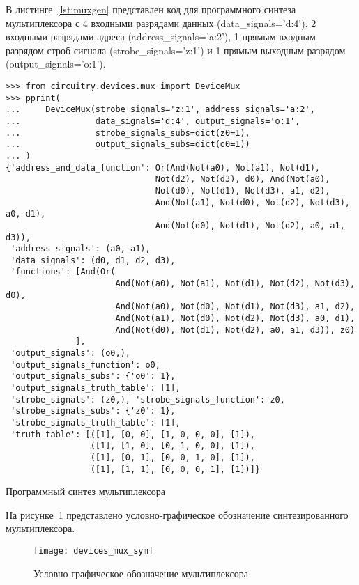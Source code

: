 \documentclass[document.tex]{subfiles}
\begin{document}
\clearpage
В листинге~\ref{lst:muxgen} представлен код для программного синтеза
мультиплексора с 4 входными разрядами данных (data\_signals='d:4'), 2 входными
разрядами адреса (address\_signals='a:2'), 1 прямым входным разрядом
строб-сигнала (strobe\_signals='z:1') и 1 прямым выходным разрядом
(output\_signals='o:1').

\begin{listing}[ht]
\begin{verbatim}
>>> from circuitry.devices.mux import DeviceMux        
>>> pprint(                                               
...     DeviceMux(strobe_signals='z:1', address_signals='a:2',
...               data_signals='d:4', output_signals='o:1',
...               strobe_signals_subs=dict(z0=1),
...               output_signals_subs=dict(o0=1))
... )
{'address_and_data_function': Or(And(Not(a0), Not(a1), Not(d1), 
                              Not(d2), Not(d3), d0), And(Not(a0), 
                              Not(d0), Not(d1), Not(d3), a1, d2), 
                              And(Not(a1), Not(d0), Not(d2), Not(d3), a0, d1), 
                              And(Not(d0), Not(d1), Not(d2), a0, a1, d3)),
 'address_signals': (a0, a1),
 'data_signals': (d0, d1, d2, d3),
 'functions': [And(Or(
                      And(Not(a0), Not(a1), Not(d1), Not(d2), Not(d3), d0),
                      And(Not(a0), Not(d0), Not(d1), Not(d3), a1, d2),
                      And(Not(a1), Not(d0), Not(d2), Not(d3), a0, d1),
                      And(Not(d0), Not(d1), Not(d2), a0, a1, d3)), z0)
              ],
 'output_signals': (o0,), 
 'output_signals_function': o0, 
 'output_signals_subs': {'o0': 1}, 
 'output_signals_truth_table': [1],
 'strobe_signals': (z0,), 'strobe_signals_function': z0,
 'strobe_signals_subs': {'z0': 1},
 'strobe_signals_truth_table': [1],
 'truth_table': [([1], [0, 0], [1, 0, 0, 0], [1]),
                 ([1], [1, 0], [0, 1, 0, 0], [1]),
                 ([1], [0, 1], [0, 0, 1, 0], [1]),
                 ([1], [1, 1], [0, 0, 0, 1], [1])]}
\end{verbatim}
\caption{Программный синтез мультиплексора}
\label{lst:muxgen}
\end{listing}

\clearpage

На рисунке~\ref{fig:devicemux} представлено условно-графическое обозначение
синтезированного мультиплексора.

\begin{figure}[here]
\centering
\texttt{[image: devices\_mux\_sym]}
\caption{Условно-графическое обозначение мультиплексора}
\label{fig:devicemux}
\end{figure}
\end{document}
